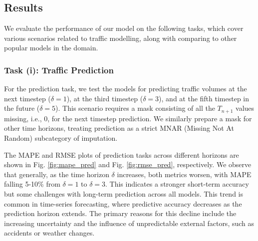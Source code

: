 \subsection{Results}

We evaluate the performance of our model on the following tasks, which cover various scenarios related to traffic modelling, along with comparing to other popular models in the domain.

\subsubsection{Task (i): Traffic Prediction}

For the prediction task, we test the models for predicting traffic volumes at the next timestep (\(\delta = 1\)), at the third timestep (\(\delta = 3\)), and at the fifth timestep in the future (\(\delta = 5\)). This scenario requires a mask consisting of all the \(T_{n+1}\) values missing, i.e., 0, for the next timestep prediction. We similarly prepare a mask for other time horizons, treating prediction as a strict MNAR (Missing Not At Random) subcategory of imputation.

The MAPE and RMSE plots of prediction tasks across different horizons are shown in Fig. \ref{fig:mape_pred} and Fig. \ref{fig:rmse_pred}, respectively. We observe that generally, as the time horizon \(\delta\) increases, both metrics worsen, with MAPE falling 5-10\% from \(\delta=1\) to \(\delta=3\). This indicates a stronger short-term accuracy but some challenges with long-term prediction across all models. This trend is common in time-series forecasting, where predictive accuracy decreases as the prediction horizon extends. The primary reasons for this decline include the increasing uncertainty and the influence of unpredictable external factors, such as accidents or weather changes.

